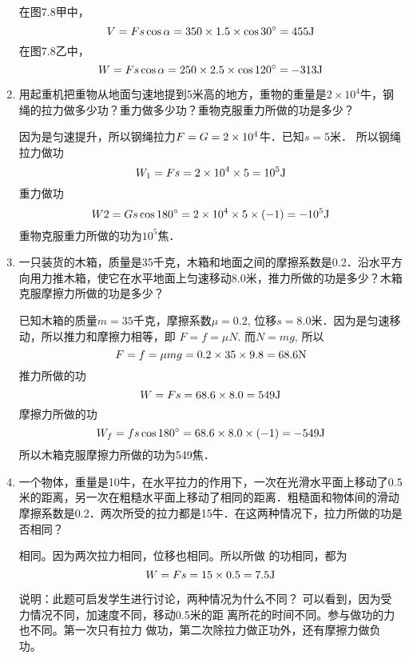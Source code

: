 \begin{enumerate}
\begin{figure}[htp]
\caption{}
\end{figure}


\begin{solution}
在图7.8甲中，
\[V=Fs\cos\alpha=350\times1.5\times\cos 30^{\circ}=455{\rm J}\]
在图7.8乙中，
\[W=Fs\cos\alpha=250\times2.5\times \cos120^{\circ}=-313{\rm J}\]
\end{solution}
    \item 用起重机把重物从地面匀速地提到5米高的地方，重物的重量是$2\times 10^4$牛，钢绳的拉力做多少功？重力做多少功？重物克服重力所做的功是多少？

    \begin{solution}
因为是匀速提升，所以钢绳拉力$F=G=2\times10^4$牛．已知$s=5$米．
所以钢绳拉力做功
\[W_1=Fs=2\times10^4\times5=10^5{\rm J}\]
重力做功
\[W2=Gs\cos180^{\circ}=2\times10^4\times5\times(-1)=-10^5{\rm J}\]
重物克服重力所做的功为$10^5$焦．
    \end{solution}
    \item 一只装货的木箱，质量是35千克，木箱和地面之间的摩擦系数是0.2．沿水平方向用力推木箱，使它在水平地面上匀速移动8.0米，推力所做的功是多少？木箱克服摩擦力所做的功是多少？

    \begin{solution}
        已知木箱的质量$m=35$千克，摩擦系数$\mu =0.2$, 位移$s=8.0$米．因为是匀速移动，所以推力和摩擦力相等，即
        $F=f=\mu N$. 而$N=mg$, 所以
        \[F=f=\mu mg=0.2\times35\times9.8=68.6{\rm N}\]
        推力所做的功
        \[W=Fs=68.6\times8.0=549{\rm J}\]
        摩擦力所做的功
        \[W_f=fs\cos180^{\circ}=68.6\times8.0\times(-1)=-549{\rm J}\]
        所以木箱克服摩擦力所做的功为549焦．
    \end{solution}
    \item 一个物体，重量是10牛，在水平拉力的作用下，一次在光滑水平面上移动了0.5米的距离，另一次在粗糙水平面上移动了相同的距离．粗糙面和物体间的滑动摩擦系数是0.2．两次所受的拉力都是15牛．在这两种情况下，拉力所做的功是否相同？

    \begin{solution}
    相同。因为两次拉力相同，位移也相同。所以所做
的功相同，都为
\[W=Fs=15\times0.5=7.5{\rm J}\]

说明：此题可启发学生进行讨论，两种情况为什么不同？
可以看到，因为受力情况不同，加速度不同，移动0.5米的距
离所花的时间不同。参与做功的力也不同。第一次只有拉力
做功，第二次除拉力做正功外，还有摩擦力做负功。
    \end{solution}
\end{enumerate}




